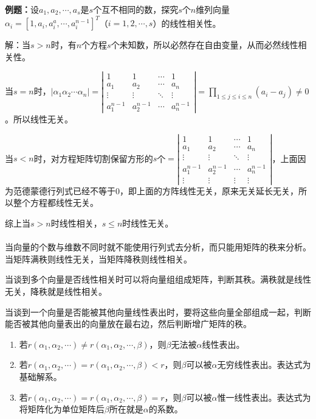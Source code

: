 \textbf{例题：}设$a_1,a_2,\cdots,a_s$是$s$个互不相同的数，探究$s$个$n$维列向量$\alpha_i=[1,a_i,a_i^a,\cdots,a_i^{n-1}]^T$（$i=1,2,\cdots,s$）的线性相关性。

解：当$s>n$时，有$n$个方程$s$个未知数，所以必然存在自由变量，从而必然线性相关性。

当$s=n$时，$\vert\alpha_1 \alpha_2 \cdots \alpha_n\vert=\left|\begin{array}{cccc}
    1 & 1 & \cdots & 1 \\
    a_1 & a_2 & \cdots & a_n \\
    \vdots & \vdots & \ddots & \vdots \\
    a_1^{n-1} & a_2^{n-1} & \cdots & a_n^{n-1}
\end{array}\right|=\prod\limits_{1\leqslant j\leqslant i\leqslant n}(a_i-a_j)\neq0$。所以线性无关。

当$s<n$时，对方程矩阵切割保留方形的$s$个$=\left|\begin{array}{cccc}
    1 & 1 & \cdots & 1 \\
    a_1 & a_2 & \cdots & a_n \\
    \vdots & \vdots & \ddots & \vdots \\
    a_1^{n-1} & a_2^{n-1} & \cdots & a_n^{n-1} \\
    \vdots & \vdots & \vdots & \vdots
\end{array}\right|$，上面因为范德蒙德行列式已经不等于0，即上面的方阵线性无关，原来无关延长无关，所以整个方程都线性无关。

综上当$s>n$时线性相关，$s\leqslant n$时线性无关。

\paragraph{}

当向量的个数与维数不同时就不能使用行列式去分析，而只能用矩阵的秩来分析。当矩阵满秩则线性无关，当矩阵降秩则线性相关。

当谈到多个向量是否线性相关时可以将向量组组成矩阵，判断其秩。满秩就是线性无关，降秩就是线性相关。

当谈到一个向量是否能被其他向量线性表出时，要将这些向量全部组成一起，判断能否被其他向量表出的向量放在最右边，然后判断增广矩阵的秩。

\begin{enumerate}
    \item 若$r(\alpha_1,\alpha_2,\cdots)\neq r(\alpha_1,\alpha_2,\cdots,\beta)$，则$\beta$无法被$\alpha$线性表出。
    \item 若$r(\alpha_1,\alpha_2,\cdots)=r(\alpha_1,\alpha_2,\cdots,\beta)<r$，则$\beta$可以被$\alpha$无穷线性表出。表达式为基础解系。
    \item 若$r(\alpha_1,\alpha_2,\cdots)=r(\alpha_1,\alpha_2,\cdots,\beta)=r$，则$\beta$可以被$\alpha$惟一线性表出。表达式为将矩阵化为单位矩阵后$\beta$所在就是$\alpha$的系数。
\end{enumerate}

